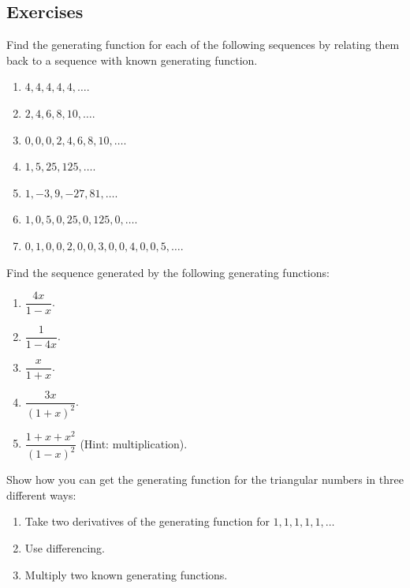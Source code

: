 \documentclass[10pt,]{book}
\theoremstyle{plain}
\theoremstyle{definition}
\theoremstyle{definition}
\theoremstyle{definition}
\theoremstyle{definition}
\numberwithin{equation}{chapter}
\begin{document}
\subsection*{Exercises}\label{exercises-8}
\begin{divisionexercise}{1}\hypertarget{exercise-84}{}
\hypertarget{p-1009}{}%
Find the generating function for each of the following sequences by relating them back to a sequence with known generating function.%
\par
\hypertarget{p-1010}{}%
\leavevmode%
\begin{enumerate}[label=(\alph*)]
\item\hypertarget{li-160}{}\(4,4,4,4,4,\ldots\).%
\item\hypertarget{li-161}{}\(2, 4, 6, 8, 10, \ldots\).%
\item\hypertarget{li-162}{}\(0,0,0,2,4,6,8,10,\ldots\).%
\item\hypertarget{li-163}{}\(1, 5, 25, 125, \ldots\).%
\item\hypertarget{li-164}{}\(1, -3, 9, -27, 81, \ldots\).%
\item\hypertarget{li-165}{}\(1, 0, 5, 0, 25, 0, 125, 0, \ldots\).%
\item\hypertarget{li-166}{}\(0, 1, 0, 0, 2, 0, 0, 3, 0, 0, 4, 0, 0, 5, \ldots\).%
\end{enumerate}
%
\end{divisionexercise}%
\begin{divisionexercise}{2}\hypertarget{exercise-85}{}
\hypertarget{p-1012}{}%
Find the sequence generated by the following generating functions:%
\par
\hypertarget{p-1013}{}%
\leavevmode%
\begin{enumerate}[label=(\alph*)]
\item\hypertarget{li-174}{}\(\dfrac{4x}{1-x}\).%
\item\hypertarget{li-175}{}\(\dfrac{1}{1-4x}\).%
\item\hypertarget{li-176}{}\(\dfrac{x}{1+x}\).%
\item\hypertarget{li-177}{}\(\dfrac{3x}{(1+x)^2}\).%
\item\hypertarget{li-178}{}\(\dfrac{1+x+x^2}{(1-x)^2}\) (Hint: multiplication).%
\end{enumerate}
%
\end{divisionexercise}%
\begin{divisionexercise}{3}\hypertarget{exercise-86}{}
\hypertarget{p-1015}{}%
Show how you can get the generating function for the triangular numbers in three different ways:%
\par
\hypertarget{p-1016}{}%
\leavevmode%
\begin{enumerate}[label=(\alph*)]
\item\hypertarget{li-184}{}\hypertarget{p-1017}{}%
Take two derivatives of the generating function for \(1,1,1,1,1, \ldots\)%
\item\hypertarget{li-185}{}\hypertarget{p-1018}{}%
Use differencing.%
\item\hypertarget{li-186}{}\hypertarget{p-1019}{}%
Multiply two known generating functions.%
\end{enumerate}
%
\end{divisionexercise}%
\end{document}
